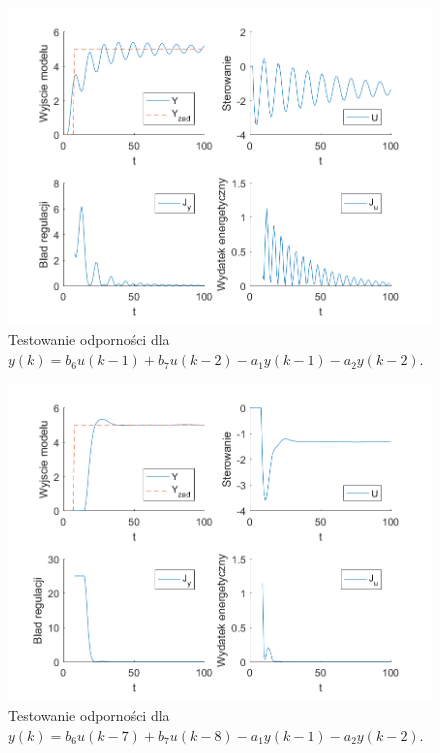 \documentclass[a4paper, 10pt]{article}
\begin{document}
	\begin{figure}[H]
			\centering
			\includegraphics[width=0.9\linewidth]{z6_5}
			\caption{Testowanie odporności dla  $y(k) = b_6u(k-1)+b_7u(k-2)-a_1y(k-1)-a_2y(k-2)$.}
			\label{fig:z6_5}
			\end{figure}
		
	\begin{figure}[H]
		\centering
		\includegraphics[width=0.9\linewidth]{z6_-1}
		\caption{Testowanie odporności dla  $y(k) = b_6u(k-7)+b_7u(k-8)-a_1y(k-1)-a_2y(k-2)$.}
		\label{fig:z6_-1}
		\end{figure}
		
\end{document}
